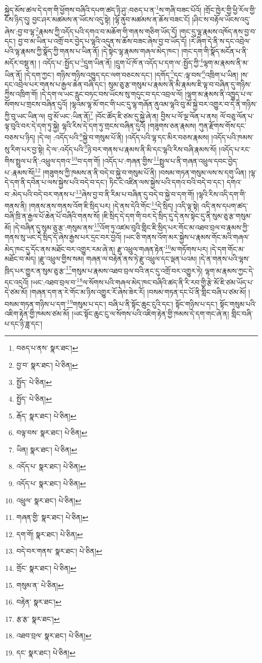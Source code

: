 སྐྱེད་མོས་ཚལ་དེ་དག་གི་ཕྱོགས་བཞིའི་དཔག་ཚད་ཉི་ཤུ་:བཅད་པ་ན་\footnote{བཅད་པ་ནས་  སྣར་ཐང་། }ས་གཞི་བཟང་པོའོ། །གྲོང་ཁྱེར་གྱི་ཕྱི་རོལ་གྱི་ངོས་ཉིད་དུ། བྱང་ཤར་མཚམས་ན་ཡོངས་འདུ་སྟེ། །ལྷོ་ནུབ་མཚམས་ན་ཆོས་བཟང་ངོ། །ཤིང་ས་བརྟོལ་ཡོངས་འདུ་ཞེས་:བྱ་བ་ལྷ་\footnote{བྱ་བ་  སྣར་ཐང་།  པེ་ཅིན། }རྣམས་ཀྱི་འདོད་པའི་དགའ་བ་མཆོག་གི་གནས་གཅིག་ཡོད་དོ། །གང་དུ་ལྷ་རྣམས་འཁོད་ནས་བྱ་བ་དང་། བྱ་བ་མ་ཡིན་པ་འགྲོ་བར་བྱེད་པ་ལྷའི་འདུན་ས་ཆོས་བཟང་ཞེས་བྱ་བ་ཡོད་དོ། །རེ་ཞིག་དེ་ནི་ས་དང་འབྲེལ་པའི་ལྷ་རྣམས་ཀྱི་སྣོད་ཀྱི་གནས་པ་ཡིན་ནོ། །དེ་སྟེང་ལྷ་རྣམས་གཞལ་མེད་ཁང་། །གང་དག་གི་སྣོད་མངོན་པ་ནི་མདོར་བསྡུ་ན། །
འདོད་པ་:སྤྱོད་པ་\footnote{སྤྱོད་  པེ་ཅིན། }དྲུག་ཡིན་ནོ། །དྲུག་པོ་ཁོ་ན་འདོད་པ་དག་ལ་:སྤྱོད་ཀྱི་\footnote{སྤྱོད་  པེ་ཅིན། }ལྷག་མ་རྣམས་ནི་མ་ཡིན་ནོ། །དེ་དག་ཀྱང་། གཉིས་གཉིས་འཁྱུད་དང་ལག་བཅངས་དང་། །དགོད་\footnote{རྒོད་  སྣར་ཐང་།  པེ་ཅིན། }དང་:ལྟ་བས་\footnote{བལྟ་བས་  སྣར་ཐང་།  པེ་ཅིན། }འཁྲིག་པ་ཡིན། །ས་དང་འབྲེལ་པར་གནས་པ་རྒྱལ་ཆེན་བཞི་དང་། སུམ་ཅུ་རྩ་གསུམ་པ་རྣམས་ནི་མི་རྣམས་ཇི་ལྟ་བ་བཞིན་དུ་གཉིས་ཀྱིས་འཁྲིག་གོ། །དེ་དག་ལ་ཡང་རླུང་བཏང་བས་ཡོངས་སུ་གདུང་བ་དང་འབྲལ་ལོ། །ལྷག་མ་རྣམས་ནི་འཁྱུད་པ་ལ་སོགས་པ་གྲངས་བཞིན་དུའོ། །ལྷའམ་ལྷ་མོ་གང་གི་པང་དུ་ལྷ་གཞོན་ནུའམ་ལྷའི་བུ་མོ་སྐྱེ་བར་འགྱུར་བ་དེ་ནི་གཉིས་ཀྱི་བུ་ཡང་ཡིན་ལ། བུ་མོ་ཡང་:ཡིན་ནོ།\footnote{ཡིན།  སྣར་ཐང་།  པེ་ཅིན། } །བོང་ཚོད་ཇི་ཙམ་དུ་སྐྱེ་ཞེ་ན། བྱིས་པ་ལོ་ལྔ་ལོན་པ་ནས། ལོ་བཅུ་ལོན་པ་ལྟ་བུའི་བར་དེ་དག་ཏུ་སྐྱེ། ལྷའི་རིས་དེ་དག་ཏུ་གྲངས་བཞིན་དུའོ། །གཟུགས་ཅན་རྣམས། ཀུན་རྫོགས་གོས་དང་བཅས་པ་ཉིད། །དེ་ལ། :འདོད་པའི་\footnote{འདོད་པ་  སྣར་ཐང་།  པེ་ཅིན། }སྐྱེ་བ་གསུམ་པོ་ནི། །འདོད་པའི་ལྷ་དང་མིར་བཅས་རྣམས། །འདོད་པའི་ཁམས་སུ་རིག་པར་བྱ་སྟེ། དེ་ལ་:འདོད་པའི་\footnote{འདོད་པ་  སྣར་ཐང་།  པེ་ཅིན། }ཉེ་བར་གནས་པ་རྣམས་ནི་མི་དང་ལྷའི་རིས་བཞི་རྣམས་སོ། །འདོད་པ་རང་གིས་སྤྲུལ་པ་ནི་:འཕྲུལ་དགའ་\footnote{འཕྲུལ་  སྣར་ཐང་།  པེ་ཅིན། }བ་དག་གོ། །འདོད་པ་:གཞན་གྱིས་\footnote{གཞན་གྱི་  སྣར་ཐང་།  པེ་ཅིན། }སྤྲུལ་པ་ནི་གཞན་འཕྲུལ་དབང་བྱེད་པ་:རྣམས་སོ།\footnote{དག་གོ།  སྣར་ཐང་།  པེ་ཅིན། } །གཟུགས་ཀྱི་ཁམས་ན་ནི་བདེ་བ་སྐྱེ་བ་གསུམ་པོ་ནི། །བསམ་གཏན་གསུམ་ལས་ས་དགུ་ཡིན། །ལྷ་དེ་དག་ནི་དབེན་པ་ལས་སྐྱེས་པའི་བདེ་བ་དང་། ཏིང་ངེ་འཛིན་ལས་སྐྱེས་པའི་དགའ་བའི་བདེ་བ་དང་། དགའ་བ་:མེད་པའི་བདེ་བར་གནས་པ་\footnote{བདེ་བར་གནས་  སྣར་ཐང་།  པེ་ཅིན། }ཞེས་བྱ་བ་ནི་རིམ་པ་བཞིན་དུ་བདེ་བ་སྐྱེ་བ་དག་གོ། །ལྷའི་རིས་འདི་དག་གི་གནས་ནི། །གནས་ནས་གནས་འོག་ཇི་སྲིད་པར། །དེ་ནས་དེའི་གོང་\footnote{གྲོང་  སྣར་ཐང་།  པེ་ཅིན། }དེ་སྲིད། །འདི་ལྟ་སྟེ། འདི་ནས་དཔག་ཚད་བཞི་ཁྲི་ན་རྒྱལ་པོ་ཆེན་པོ་བཞིའི་གནས་སོ། །ཇི་སྲིད་དེ་དག་གི་བར་དེ་སྲིད་དུ་དེ་ནས་སྟེང་དུ་ནི་སུམ་ཅུ་རྩ་གསུམ་མོ། །དེ་བཞིན་དུ་སུམ་ཅུ་རྩ་:གསུམ་ནས་\footnote{གསུམ་ན་  པེ་ཅིན། }འོག་ཏུ་འཛམ་བུའི་གླིང་ཇི་སྲིད་པར་གོང་མ་འཐབ་བྲལ་བ་རྣམས་ཀྱི་གནས་སུ་ཡང་དེ་སྲིད་དོ་ཞེས་རྒྱས་པར་དྲང་བར་བྱའོ། །ཡང་ཅི་གནས་འོག་མར་སྐྱེས་པ་རྣམས་གོང་མའི་གཞལ་མེད་ཁང་དུ་དོང་ནས་མཐོང་བར་འགྱུར་རམ་ཞེ་ན། རྫུ་འཕྲུལ་གཞན་རྟེན་\footnote{བརྟེན་  སྣར་ཐང་། }མ་གཏོགས་པར། །དེ་དག་གོང་མ་མཐོང་བ་མེད། །རྫུ་འཕྲུལ་གྱིས་སམ། གཞན་ལ་བརྟེན་ནས་ཏེ་རྫུ་འཕྲུལ་དང་ལྡན་པའམ། །དེ་ན་གནས་པའི་ལྷས་ཁྲིད་པར་གྱུར་ན་སུམ་ཅུ་རྩ་\footnote{རྩ་རྩ་  སྣར་ཐང་། }གསུམ་པ་རྣམས་འཐབ་བྲལ་བའི་ནང་དུ་འགྲོ་བར་འགྱུར་ཏེ། ལྷག་མ་རྣམས་ཀྱང་དེ་དང་འདྲའོ། །ཡང་:འཐབ་བྲལ་བ་\footnote{འཐབ་བྲལ་  སྣར་ཐང་།  པེ་ཅིན། }ལ་སོགས་པའི་གཞལ་མེད་ཁང་བཞིའི་ཚད་ནི་རི་རབ་གྱི་རྩེ་མོ་ཇི་ཙམ་ཡོད་པ་དེ་ཙམ་མོ། །གཞན་དག་ན་རེ་གོང་མ་ཉིས་འགྱུར་རོ་ཞེས་ཟེར་རོ། །བསམ་གཏན་དང་པོ་ནི་གླིང་བཞི་པ་ཙམ་མོ། །བསམ་གཏན་གཉིས་པ་དག་\footnote{དང་  སྣར་ཐང་།  པེ་ཅིན། }གསུམ་པ་དང་། བཞི་པ་ནི་སྟོང་ཆུང་ངུའི་དང་། སྟོང་གཉིས་པ་དང་། སྟོང་གསུམ་པའི་འཇིག་རྟེན་གྱི་ཁམས་ཙམ་མོ། །ཡང་སྟོང་ཆུང་ངུ་ལ་སོགས་པའི་འཇིག་རྟེན་གྱི་ཁམས་དེ་དག་གང་ཞེ་ན། གླིང་བཞི་པ་དང་ཉི་ཟླ་དང་། 